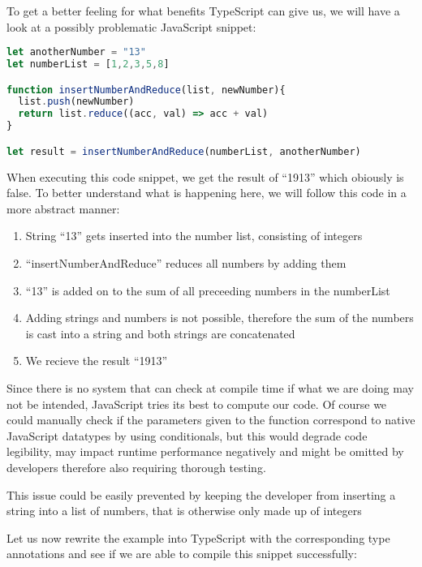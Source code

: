 \documentclass[letterpaper,runningheads]{llncs}
\begin{document}
\clearpage

To get a better feeling for what benefits TypeScript can give us,
we will have a look at a possibly problematic JavaScript snippet:

\begin{lstlisting}[style=ES6, language=JavaScript, caption="Problematic JavaScript code snippet"]
let anotherNumber = "13"
let numberList = [1,2,3,5,8]

function insertNumberAndReduce(list, newNumber){
  list.push(newNumber)
  return list.reduce((acc, val) => acc + val)
}

let result = insertNumberAndReduce(numberList, anotherNumber)
\end{lstlisting}

When executing this code snippet, we get the result of ``1913''
which obiously is false. To better understand what is happening here,
we will follow this code in a more abstract manner:

\begin{enumerate}
\item String ``13'' gets inserted into the number list, consisting of
integers
\item ``insertNumberAndReduce'' reduces all numbers by adding them
\item ``13'' is added on to the sum of all preceeding numbers in the numberList
\item Adding strings and numbers is not possible, therefore the sum of the
numbers is cast into a string and both strings are concatenated
\item We recieve the result ``1913''
\end{enumerate}

Since there is no system that can check at compile time if what we are doing may not
be intended, JavaScript tries its best to compute our code. Of course we could manually check if the parameters given to the function correspond to native JavaScript datatypes by using conditionals, but this would  degrade code legibility, may impact runtime performance negatively and might be omitted by developers therefore also requiring thorough testing.

\begin{claim}
This issue could be easily prevented by keeping the developer from inserting
a string into a list of numbers, that is otherwise only made up of
integers
\end{claim}

Let us now rewrite the example into TypeScript with the corresponding
type annotations and see if we are able to compile this snippet successfully:
\end{document}
